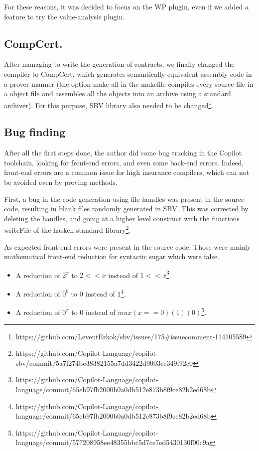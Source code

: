 \documentclass[a4paper,11pt,final]{article}
\begin{document}
	For these reasons, it was decided to focus on the WP plugin, even if we added a feature to try the value-analysis plugin.
	\subsection{CompCert.}
	
	After managing to write the generation of contracts, we finally changed the compiler to CompCert, which generates semantically equivalent assembly code in a prover manner (the option make all in the makefile compiles every source file in a object file and assembles all the objects into an archive using a standard archiver). For this purpose, SBV library also needed to be changed\footnote{https://github.com/LeventErkok/sbv/issues/175\#issuecomment-114105589}.
	
	\subsection{Bug finding}
	After all the first steps done, the author did some bug tracking in the Copilot toolchain, looking for front-end errors, and even some back-end errors. Indeed, front-end errors are a common issue for high insurance compilers, which can not be avoided even by proving methods\cite{bugC}. 
	
	First, a bug in the code generation using file handles was present in the source code, resulting in blank files randomly generated in SBV. This was corrected by deleting the handles, and going at a higher level construct with the functions writeFile of the haskell standard library\footnote{https://github.com/Copilot-Language/copilot-sbv/commit/5a7f274be38382155a7dd3422d9003ec349f92c0}. 
	
	As expected front-end errors were present in the source code. Those were mainly mathematical front-end reduction for syntactic sugar which were false.
	
	\begin{itemize}
		\item A reduction of $2^x$ to $2 << x$ instead of $1 << x$\footnote{https://github.com/Copilot-Language/copilot-language/commit/65eb97fb2000b0a0db512e873b8f9ce82b2ed68b}.
		\item A reduction of $0^0$ to $0$ instead of $1$\footnote{https://github.com/Copilot-Language/copilot-language/commit/65eb97fb2000b0a0db512e873b8f9ce82b2ed68b}.
		\item A reduction of $0^x$ to $0$ instead of $mux (x==0) (1) (0)$\footnote{https://github.com/Copilot-Language/copilot-language/commit/577208958ee48355bbc5d7ce7ed5430130f00c9a}.
	\end{itemize}
	
\end{document}
